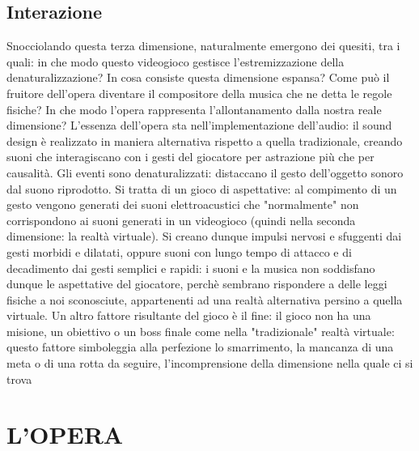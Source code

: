 	\subsection*{Interazione}
	Snocciolando questa terza dimensione, naturalmente emergono dei quesiti, tra i quali: in che modo questo videogioco gestisce l'estremizzazione della denaturalizzazione? In cosa consiste questa dimensione espansa? Come può il fruitore dell'opera diventare il compositore della musica che ne detta le regole fisiche? In che modo  l'opera rappresenta l'allontanamento dalla nostra reale dimensione?
	L'essenza dell'opera sta nell'implementazione dell'audio: il sound design è realizzato in maniera alternativa rispetto a quella tradizionale, creando suoni che interagiscano con i gesti del giocatore per astrazione più che per causalità. Gli eventi sono denaturalizzati: distaccano il gesto dell'oggetto sonoro dal suono riprodotto.
	Si tratta di un gioco di aspettative: al compimento di un gesto vengono generati dei suoni elettroacustici che "normalmente" non corrispondono ai suoni generati in un videogioco (quindi nella seconda dimensione: la realtà virtuale). Si creano dunque impulsi nervosi e sfuggenti dai gesti morbidi e dilatati, oppure suoni con lungo tempo di attacco e di decadimento dai gesti semplici e rapidi: i suoni e la musica non soddisfano dunque le aspettative del giocatore, perchè sembrano rispondere a delle leggi fisiche a noi sconosciute, appartenenti ad una realtà alternativa persino a quella virtuale.
	Un altro fattore risultante del gioco è il fine: il gioco non ha una misione, un obiettivo o un boss finale come nella "tradizionale" realtà virtuale: questo fattore simboleggia alla perfezione lo smarrimento, la mancanza di una meta o di una rotta da seguire, l'incomprensione della dimensione nella quale ci si trova

\section*{L'OPERA}

